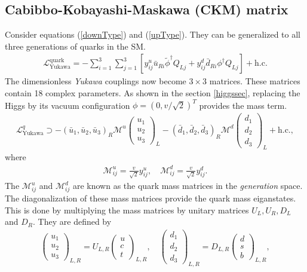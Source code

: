 \subsection{Cabibbo-Kobayashi-Maskawa (CKM) matrix}  
Consider equations (\ref{downType}) and (\ref{upType}). They can be generalized to all three generations of quarks in the SM.
\begin{eqnarray}
\mathcal{L}_{\mathrm{Yukawa}}^{\text{quark}}=-\sum_{i=1}^{3} \sum_{j=1}^{3}\left[y_{i j}^{u} \bar{u}_{R i} \tilde{\phi}^{\dagger} Q_{L j}+y_{i j}^{d} \bar{d}_{R i} \phi^{\dagger} Q_{L j}\right]+\mathrm{h.c.}
\end{eqnarray}
The dimensionless \textit{Yukawa} couplings now become $3\times3$ matrices. These matrices contain 18 complex parameters. As shown in the section \ref{higgssec}, replacing the Higgs by its vacuum configuration $\phi=(0, v/\sqrt{2})^T$ provides the mass term. 
\begin{eqnarray}
\mathcal{L}_{\mathrm{Yukawa}}^{q} \supset-\left(\bar{u}_{1}, \bar{u}_{2}, \bar{u}_{3}\right)_{R} \mathcal{M}^{u}\left(\begin{array}{c}{u_{1}} \\ {u_{2}} \\ {u_{3}}\end{array}\right)_{L}-\left(\bar{d}_{1}, \bar{d}_{2}, \bar{d}_{3}\right)_{R} \mathcal{M}^{d}\left(\begin{array}{c}{d_{1}} \\ {d_{2}} \\ {d_{3}}\end{array}\right)_{L}+\mathrm{h.c.},
\end{eqnarray}
where 
\begin{eqnarray}
\mathcal{M}_{i j}^{u}=\frac{v}{\sqrt{2}} y_{i j}^{u}, \quad \mathcal{M}_{i j}^{d}=\frac{v}{\sqrt{2}} y_{i j}^{d}.
\end{eqnarray}
The $\mathcal{M}_{i j}^{u}$ and $\mathcal{M}_{i j}^{d}$ are known as the quark mass matrices in the \textit{generation} space. The diagonalization of these mass matrices provide the quark mass eiganstates. This is done by multiplying the mass matrices by unitary matrices $U_{L}, U_{R}, D_{L}$ and $D_{R}$. They are defined by
\begin{eqnarray}
\left(\begin{array}{c}{u_{1}} \\ {u_{2}} \\ {u_{3}}\end{array}\right)_{L, R}=U_{L, R}\left(\begin{array}{c}{u} \\ {c} \\ {t}\end{array}\right)_{L, R}, \quad\left(\begin{array}{c}{d_{1}} \\ {d_{2}} \\ {d_{3}}\end{array}\right)_{L, R}=D_{L, R}\left(\begin{array}{c}{d} \\ {s} \\ {b}\end{array}\right)_{L, R},
\end{eqnarray}
